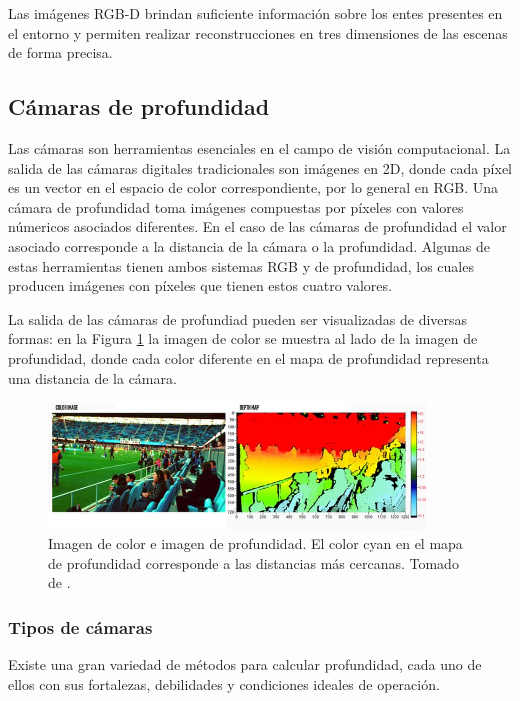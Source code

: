 Las imágenes RGB-D brindan suficiente información sobre los entes presentes en el entorno y permiten realizar reconstrucciones en tres dimensiones de las escenas de forma precisa. 

\subsection{Cámaras de profundidad}

Las cámaras son herramientas esenciales en el campo de visión computacional. La salida de las cámaras digitales tradicionales son imágenes en 2D, donde cada píxel es un vector en el espacio de color correspondiente, por lo general en RGB. Una cámara de profundidad toma imágenes compuestas por píxeles con valores númericos asociados diferentes. En el caso de las cámaras de profundidad el valor asociado corresponde a la distancia de la cámara o la profundidad. Algunas de estas herramientas tienen ambos sistemas RGB y de profundidad, los cuales producen imágenes con píxeles que tienen estos cuatro valores.

La salida de las cámaras de profundiad pueden ser visualizadas de diversas formas: en la Figura \ref{fig:rgbd} la imagen de color se muestra al lado de la imagen de profundidad, donde cada color diferente en el mapa de profundidad representa una distancia de la cámara.

\begin{figure}[ht]
	\centering
	\includegraphics[width=10cm]{./Graphics/rgbd.png}
	\caption{Imagen de color e imagen de profundidad. El color cyan en el mapa de profundidad corresponde a las distancias más cercanas. Tomado de \cite{intel}.}
	\label{fig:rgbd}
\end{figure}

\subsubsection{Tipos de cámaras}

Existe una gran variedad de métodos para calcular profundidad, cada uno de ellos con sus fortalezas, debilidades y condiciones ideales de operación. 

